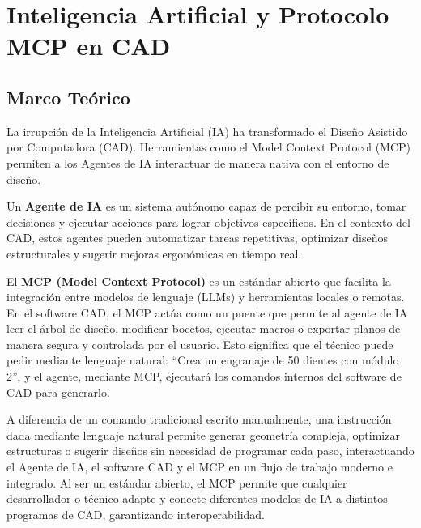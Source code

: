 \documentclass[../main]{subfiles}
\begin{document}
\chapter{Inteligencia Artificial y Protocolo MCP en CAD}
\section{Marco Teórico}

La irrupción de la Inteligencia Artificial (IA) ha transformado el Diseño Asistido por Computadora (CAD). Herramientas como el Model Context Protocol (MCP) permiten a los Agentes de IA interactuar de manera nativa con el entorno de diseño.

Un \textbf{Agente de IA} es un sistema autónomo capaz de percibir su entorno, tomar decisiones y ejecutar acciones para lograr objetivos específicos. En el contexto del CAD, estos agentes pueden automatizar tareas repetitivas, optimizar diseños estructurales y sugerir mejoras ergonómicas en tiempo real.

El \textbf{MCP (Model Context Protocol)} es un estándar abierto que facilita la integración entre modelos de lenguaje (LLMs) y herramientas locales o remotas. En el software CAD, el MCP actúa como un puente que permite al agente de IA leer el árbol de diseño, modificar bocetos, ejecutar macros o exportar planos de manera segura y controlada por el usuario. Esto significa que el técnico puede pedir mediante lenguaje natural: ``Crea un engranaje de 50 dientes con módulo 2'', y el agente, mediante MCP, ejecutará los comandos internos del software de CAD para generarlo. 

A diferencia de un comando tradicional escrito manualmente, una instrucción dada mediante lenguaje natural permite generar geometría compleja, optimizar estructuras o sugerir diseños sin necesidad de programar cada paso, interactuando el Agente de IA, el software CAD y el MCP en un flujo de trabajo moderno e integrado. Al ser un estándar abierto, el MCP permite que cualquier desarrollador o técnico adapte y conecte diferentes modelos de IA a distintos programas de CAD, garantizando interoperabilidad.
\end{document}
